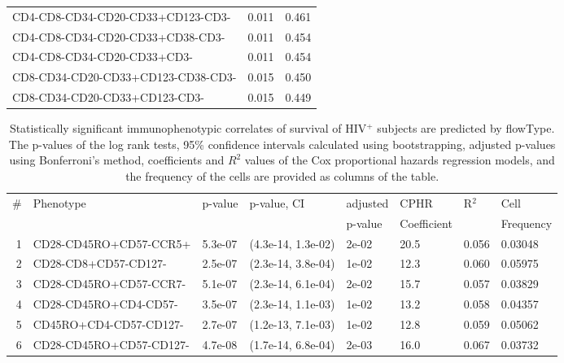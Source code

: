 \begin{table}[ht]
\begin{center}
\begin{tabular}{lll}
      CD4-CD8-CD34-CD20-CD33+CD123-CD3- & 0.011 & 0.461 \\ 
      CD4-CD8-CD34-CD20-CD33+CD38-CD3- & 0.011 & 0.454 \\ 
      CD4-CD8-CD34-CD20-CD33+CD3- & 0.011 & 0.454 \\ 
      CD8-CD34-CD20-CD33+CD123-CD38-CD3- & 0.015 & 0.450 \\ 
      CD8-CD34-CD20-CD33+CD123-CD3- & 0.015 & 0.449 \\ 
      \hline
    \end{tabular}
  \end{center}
\end{table}

\begin{landscape}
\begin{center}
  {\tiny 
    \begin{longtable}{rlllllll}
      \caption{\normalsize Statistically significant immunophenotypic correlates of survival of HIV$^+$ subjects are predicted by flowType. The p-values of the log rank tests, 95\% confidence intervals calculated using bootstrapping, adjusted p-values using Bonferroni's method, coefficients and $R^2$ values of the Cox proportional hazards regression models, and the frequency of the cells are provided as columns of the table.}\\
 \hline
      \# & Phenotype & p-value & p-value, CI & adjusted & CPHR & R$^2$ & Cell \\
      &  & & & p-value & Coefficient &  & Frequency \\
      \hline
      \endhead
      1 & CD28-CD45RO+CD57-CCR5+ & 5.3e-07 & (4.3e-14, 1.3e-02) & 2e-02 &  20.5 & 0.056 & 0.03048 \\ 
      2 & CD28-CD8+CD57-CD127- & 2.5e-07 & (2.3e-14, 3.8e-04) & 1e-02 &  12.3 & 0.060 & 0.05975 \\ 
      3 & CD28-CD45RO+CD57-CCR7- & 5.1e-07 & (2.3e-14, 6.1e-04) & 2e-02 &  15.7 & 0.057 & 0.03829 \\ 
      4 & CD28-CD45RO+CD4-CD57- & 3.5e-07 & (2.3e-14, 1.1e-03) & 1e-02 &  13.2 & 0.058 & 0.04357 \\ 
      5 & CD45RO+CD4-CD57-CD127- & 2.7e-07 & (1.2e-13, 7.1e-03) & 1e-02 &  12.8 & 0.059 & 0.05062 \\ 
      6 & CD28-CD45RO+CD57-CD127- & 4.7e-08 & (1.7e-14, 6.8e-04) & 2e-03 &  16.0 & 0.067 & 0.03732 \\ 

\end{longtable}}
\end{center}
\end{landscape}
